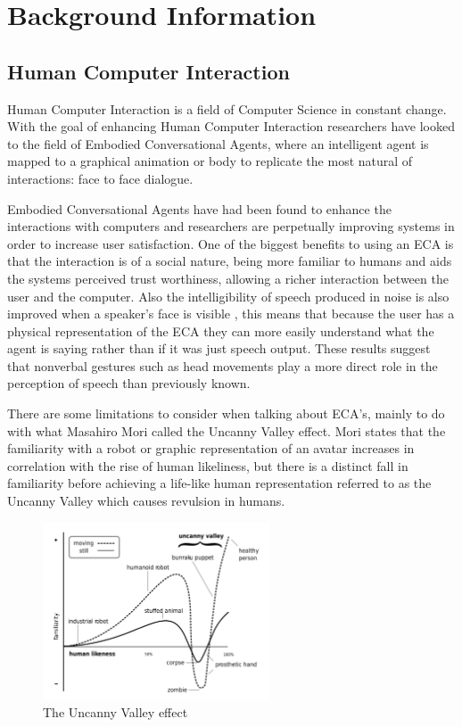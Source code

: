 \documentclass[bsc,frontabs,twoside,singlespacing,parskip]{infthesis}
\begin{document}
\chapter{Background Information}

\section{Human Computer Interaction}

Human Computer Interaction is a field of Computer Science in constant change. With the goal of enhancing Human Computer Interaction researchers have looked to the field of Embodied Conversational Agents, where an intelligent agent is mapped to a graphical animation or body to replicate the most natural of interactions: face to face dialogue. \cite{ecas} 

Embodied Conversational Agents have had been found to enhance the interactions with computers \cite{conv_agents} and researchers are perpetually improving systems in order to increase user satisfaction. One of the biggest benefits to using an ECA is that the interaction is of a social nature, being more familiar to humans and aids the systems perceived trust worthiness, allowing a richer interaction between the user and the computer. Also the intelligibility of speech produced in noise is also improved when a speaker's face is visible \cite{emotion_head_motion}, this means that because the user has a physical representation of the ECA they can more easily understand what the agent is saying rather than if it was just speech output. These results suggest that nonverbal gestures such as head movements play a more direct role in the perception of speech than previously known. \cite{vis_prosody}

There are some limitations to consider when talking about ECA's, mainly to do with what Masahiro Mori called the Uncanny Valley effect. Mori states that the familiarity with a robot or graphic representation of an avatar increases in correlation with the rise of human likeliness, but there is a distinct fall in familiarity before achieving a life-like human representation referred to as the Uncanny Valley which causes revulsion in humans. \cite{uncanny}

\begin{figure}[h!]
	\centering
	\includegraphics[width=0.6\textwidth]{uncanny}
	\caption{The Uncanny Valley effect}
\end{figure}
\end{document}
